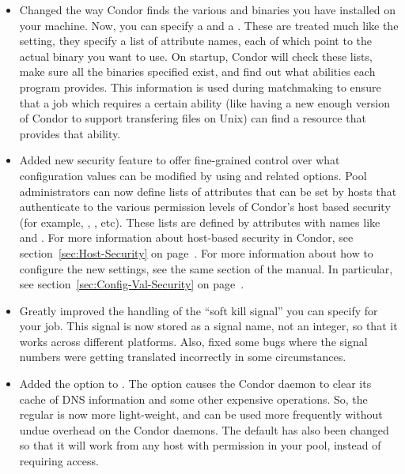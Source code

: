 \begin{itemize}
\item Changed the way Condor finds the various  and
 binaries you have installed on your machine.
Now, you can specify a  and a
.
These are treated much like the  setting, they
specify a list of attribute names, each of which point to the actual
binary you want to use.
On startup, Condor will check these lists, make sure all the binaries
specified exist, and find out what abilities each program provides.
This information is used during matchmaking to ensure that a job which
requires a certain ability (like having a new enough version of Condor
to support transfering files on Unix) can find a resource that
provides that ability.

\item Added new security feature to offer fine-grained control over
what configuration values can be modified by 
using  and related options.
Pool administrators can now define lists of attributes that can be set
by hosts that authenticate to the various permission levels of
Condor's host based security (for example, ,
, etc).
These lists are defined by attributes with names like
 and
. 
For more information about host-based security in Condor, see
section~\ref{sec:Host-Security} on page~\pageref{sec:Host-Security}.
For more information about how to configure the new settings, see the
same section of the manual.
In particular, see section~\ref{sec:Config-Val-Security} on
page~\pageref{sec:Config-Val-Security}. 

\item Greatly improved the handling of the ``soft kill signal'' you
can specify for your job.
This signal is now stored as a signal name, not an integer, so that it
works across different platforms.
Also, fixed some bugs where the signal numbers were getting translated
incorrectly in some circumstances.

\item Added the  option to .
The  option causes the Condor daemon to clear its cache of
DNS information and some other expensive operations.
So, the regular  is now more light-weight, and can
be used more frequently without undue overhead on the Condor daemons. 
The default  has also been changed so that it will
work from any host with  permission in your pool,
instead of requiring  access.


\end{itemize}
